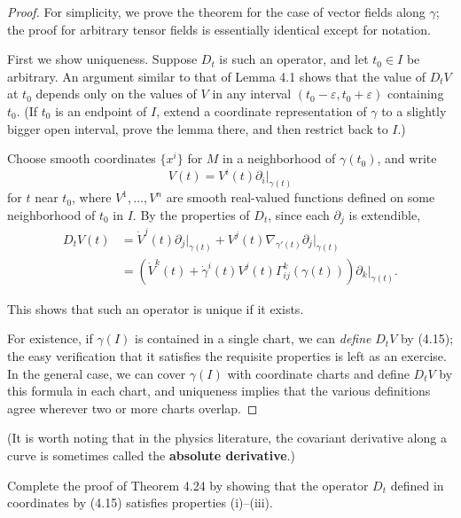 \begin{proof}
For simplicity, we prove the theorem for the case of vector fields along $\gamma$; the proof for arbitrary tensor fields is essentially identical except for notation.

First we show uniqueness. Suppose $D_t$ is such an operator, and let $t_0 \in I$ be arbitrary. An argument similar to that of Lemma 4.1 shows that the value of $D_t V$ at $t_0$ depends only on the values of $V$ in any interval $(t_0 - \varepsilon, t_0 + \varepsilon)$ containing $t_0$. (If $t_0$ is an endpoint of $I$, extend a coordinate representation of $\gamma$ to a slightly bigger open interval, prove the lemma there, and then restrict back to $I$.)

Choose smooth coordinates $\{x^i\}$ for $M$ in a neighborhood of $\gamma(t_0)$, and write
\[
V(t) = V^i(t)\partial_i\bigg|_{\gamma(t)}
\]
for $t$ near $t_0$, where $V^1, \ldots, V^n$ are smooth real-valued functions defined on some neighborhood of $t_0$ in $I$. By the properties of $D_t$, since each $\partial_j$ is extendible,
\begin{align}
D_tV(t) &= \dot{V}^j(t)\partial_j\bigg|_{\gamma(t)} + V^j(t)\nabla_{\gamma'(t)}\partial_j\bigg|_{\gamma(t)} \nonumber \\
&= \left(\dot{V}^k(t) + \dot{\gamma}^i(t)V^j(t)\Gamma_{ij}^k(\gamma(t))\right)\partial_k\bigg|_{\gamma(t)}. \tag{4.15}
\end{align}

This shows that such an operator is unique if it exists.

For existence, if $\gamma(I)$ is contained in a single chart, we can \emph{define} $D_t V$ by (4.15); the easy verification that it satisfies the requisite properties is left as an exercise. In the general case, we can cover $\gamma(I)$ with coordinate charts and define $D_t V$ by this formula in each chart, and uniqueness implies that the various definitions agree wherever two or more charts overlap.
\end{proof}

(It is worth noting that in the physics literature, the covariant derivative along a curve is sometimes called the \textbf{absolute derivative}.)

\begin{exercise}
\label{exer:covariant-derivative-properties}
Complete the proof of Theorem 4.24 by showing that the operator $D_t$ defined in coordinates by (4.15) satisfies properties (i)--(iii).
\end{exercise}

